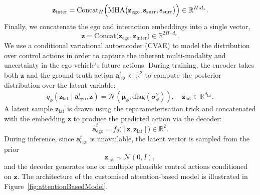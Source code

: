 \documentclass[journal]{IEEEtran}
\begin{document}
\begin{equation}
    \mathbf{z}_{\text{inter}} = \text{Concat}_H\Bigl(\text{MHA}\bigl(\mathbf{z}_{\text{ego}}, \mathbf{s}_{\text{surr}},\mathbf{s}_{\text{surr}}\bigr)\Bigr)\in \mathbb{R}^{H\cdot d_z}.
\end{equation}
Finally, we concatenate the ego and interaction embeddings into a single vector,
\begin{equation}
    \mathbf{z} = \text{Concat}\bigl(\mathbf{z}_{\text{ego}}, \mathbf{z}_{\text{inter}}\bigr) \in \mathbb{R}^{2 H \cdot d_z}.
\end{equation}
We use a conditional variational autoencoder (CVAE) \cite{sohn_LearningStructuredOutput_2015} to model the distribution over control actions in order to capture the inherent multi-modality and uncertainty in the ego vehicle's future actions. During training, the encoder takes both $\mathbf{z}$ and the ground-truth action $\mathbf{a}_{\text{ego}}^{t} \in \mathbb{R}^{2}$ to compute the posterior distribution over the latent variable:
\begin{equation}
    q_\phi(\mathbf{z}_\text{lat} \mid \mathbf{a}_{\text{ego}}^{t}, \mathbf{z}) = \mathcal{N}(\boldsymbol{\mu}_\phi, \text{diag}(\boldsymbol{\sigma}_\phi^2)), \quad \mathbf{z}_\text{lat} \in \mathbb{R}^{d_\text{lat}}.
\end{equation}
A latent sample $\mathbf{z}_\text{lat}$ is drawn using the reparameterisation trick and concatenated with the embedding $\mathbf{z}$ to produce the predicted action via the decoder:
\begin{equation}
    \hat{\mathbf{a}}_{\text{ego}}^{t} = f_\theta\bigl([\mathbf{z}, \mathbf{z}_\text{lat}]\bigr) \in \mathbb{R}^{2}.
\end{equation}
During inference, since $\mathbf{a}_{\text{ego}}^{t}$ is unavailable, the latent vector is sampled from the prior
\begin{equation}
    \mathbf{z}_\text{lat} \sim \mathcal{N}(0,I),
\end{equation}
and the decoder generates one or multiple plausible control actions conditioned on $\mathbf{z}$. The architecture of the customised attention-based model is illustrated in Figure~\ref{fig:attentionBasedModel}.
\end{document}

